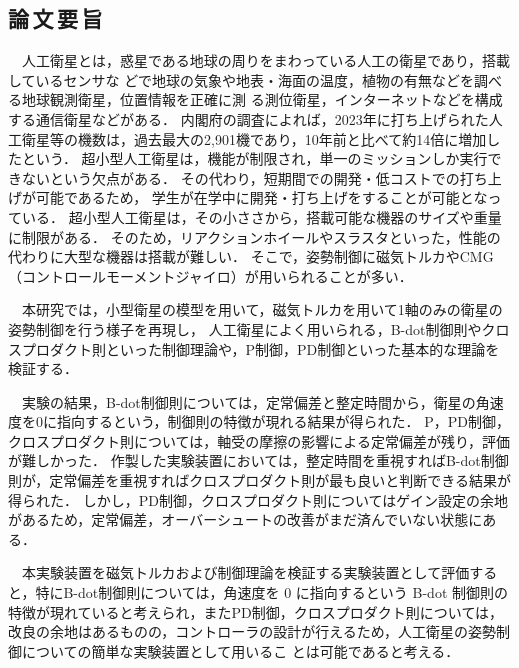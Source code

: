 \begin{center}
\section*{論\,文\,要\,旨}                      %
\end{center}

　人工衛星とは，惑星である地球の周りをまわっている人工の衛星であり，搭載しているセンサな
どで地球の気象や地表・海面の温度，植物の有無などを調べる地球観測衛星，位置情報を正確に測
る測位衛星，インターネットなどを構成する通信衛星などがある．
内閣府の調査によれば，2023年に打ち上げられた人工衛星等の機数は，過去最大の2,901機であり，10年前と比べて約14倍に増加したという．
超小型人工衛星は，機能が制限され，単一のミッションしか実行できないという欠点がある．
その代わり，短期間での開発・低コストでの打ち上げが可能であるため，
学生が在学中に開発・打ち上げをすることが可能となっている．
超小型人工衛星は，その小ささから，搭載可能な機器のサイズや重量に制限がある．
そのため，リアクションホイールやスラスタといった，性能の代わりに大型な機器は搭載が難しい．
そこで，姿勢制御に磁気トルカやCMG（コントロールモーメントジャイロ）が用いられることが多い．

　本研究では，小型衛星の模型を用いて，磁気トルカを用いて1軸のみの衛星の姿勢制御を行う様子を再現し，
人工衛星によく用いられる，B-dot制御則やクロスプロダクト則といった制御理論や，P制御，PD制御といった基本的な理論を検証する．

　実験の結果，B-dot制御則については，定常偏差と整定時間から，衛星の角速度を0に指向するという，制御則の特徴が現れる結果が得られた．
P，PD制御，クロスプロダクト則については，軸受の摩擦の影響による定常偏差が残り，評価が難しかった．
作製した実験装置においては，整定時間を重視すればB-dot制御則が，定常偏差を重視すればクロスプロダクト則が最も良いと判断できる結果が得られた．
しかし，PD制御，クロスプロダクト則についてはゲイン設定の余地があるため，定常偏差，オーバーシュートの改善がまだ済んでいない状態にある．

　本実験装置を磁気トルカおよび制御理論を検証する実験装置として評価すると，特にB-dot制御則については，角速度を 0 に指向するという B-dot 制御則の
特徴が現れていると考えられ，またPD制御，クロスプロダクト則については，改良の余地はあるものの，コントローラの設計が行えるため，人工衛星の姿勢制御についての簡単な実験装置として用いるこ
とは可能であると考える．


